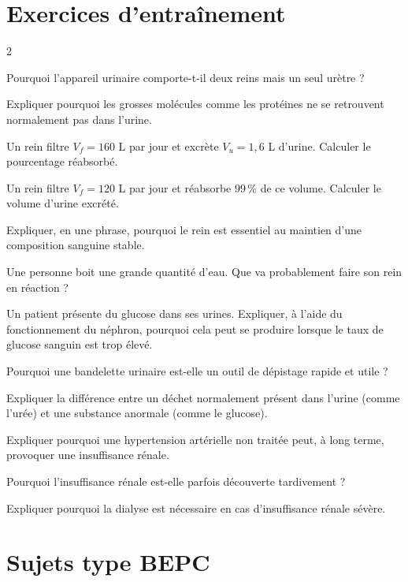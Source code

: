 \section{Exercices d'entraînement}
\begin{multicols}{2}

\exo{} Pourquoi l'appareil urinaire comporte-t-il deux reins mais un seul
urètre ?

\exo{} Expliquer pourquoi les grosses molécules comme les protéines ne se
retrouvent normalement pas dans l'urine.

\exo{} Un rein filtre $V_f=160$ L par jour et excrète $V_u=1{,}6$ L d'urine.
Calculer le pourcentage réabsorbé.

\exo{} Un rein filtre $V_f=120$ L par jour et réabsorbe $99\,\%$ de ce volume.
Calculer le volume d'urine excrété.

\exo{} Expliquer, en une phrase, pourquoi le rein est essentiel au maintien
d'une composition sanguine stable.

\exo{} Une personne boit une grande quantité d'eau. Que va probablement faire son
rein en réaction ?

\exo{} Un patient présente du glucose dans ses urines. Expliquer, à l'aide du
fonctionnement du néphron, pourquoi cela peut se produire lorsque le taux de glucose
sanguin est trop élevé.

\exo{} Pourquoi une bandelette urinaire est-elle un outil de dépistage rapide et
utile ?

\exo{} Expliquer la différence entre un déchet normalement présent dans l'urine
(comme l'urée) et une substance anormale (comme le glucose).

\exo{} Expliquer pourquoi une hypertension artérielle non traitée peut, à long
terme, provoquer une insuffisance rénale.

\exo{} Pourquoi l'insuffisance rénale est-elle parfois découverte
tardivement ?

\exo{} Expliquer pourquoi la dialyse est nécessaire en cas d'insuffisance
rénale sévère.

\end{multicols}

\section{Sujets type BEPC}

